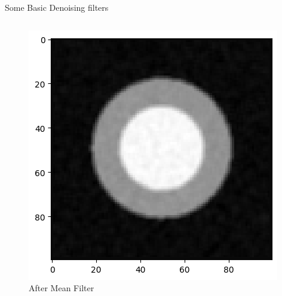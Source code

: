 \documentclass{beamer}
\begin{document}
\begin{frame}{Some Basic Denoising filters}
\begin{columns}
        \begin{figure}
            \centering
            \includegraphics[scale = 0.4]{img/mean.png}
            \caption{After Mean Filter}
            \label{fig:dual fig demo 2}
        \end{figure}
\end{columns} 

\end{frame}
\end{document}
